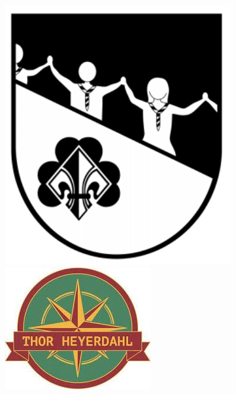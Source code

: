 \begin{titlepage}
\begin{center}
\begin{figure}[h!]
\begin{minipage}{.2\linewidth}
            \end{minipage}%
            \begin{minipage}{.2\linewidth}
                \centering
                \includegraphics[width=0.9\textwidth]{../img/bdp_weisse-rotte.png}
            \end{minipage}%
            \begin{minipage}{.2\linewidth}
                \centering
                \includegraphics[width=\textwidth]{../img/bdp_thor-heyerdahl.jpg}

\end{minipage}
\end{figure}
\end{center}
\end{titlepage}
